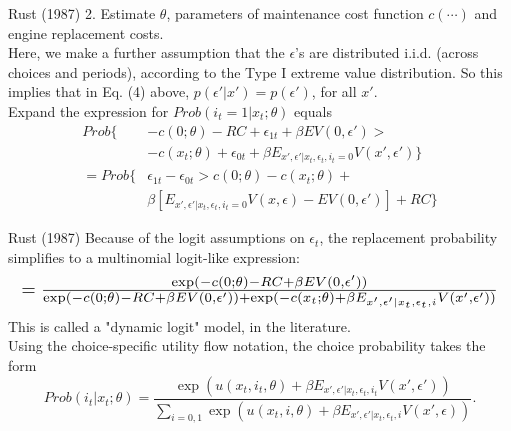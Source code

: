 \documentclass[xcolor=pdftex,dvipsnames,table,mathserif]{beamer}
\begin{document}
\begin{frame}{Rust (1987)}
2. Estimate $\theta$, parameters of maintenance cost function $c (\cdots)$ and engine replacement costs. \\
\vspace{3mm}
Here, we make a further assumption that the $\epsilon$'s are distributed i.i.d. (across choices and periods), according to the Type I extreme value distribution. So this implies that in Eq. (4) above, $p(\epsilon ' | x') = p(\epsilon ')$, for all $x'$. \\
\vspace{3mm}
Expand the expression for $Prob(i_t = 1 |x_t; \theta)$ equals
\begin{equation*}
\begin{split}
 Prob \{& -c(0; \theta) - RC + \epsilon_{1t} + \beta  EV(0, \epsilon ') > \\
  &- c(x_t; \theta) + \epsilon_{0t}  + \beta E_{x', \epsilon ' | x_t, \epsilon_t, i_t =0 } V( x', \epsilon ' ) \} \\
= Prob \{& \epsilon_{1t} - \epsilon_{0t} > c(0;\theta) - c(x_t; \theta) + \\
& \beta [E_{x', \epsilon ' | x_t, \epsilon_t, i_t =0 }  V( x, \epsilon )  - EV(0, \epsilon ')] + RC \}
\end{split}
\end{equation*}
\end{frame}

\begin{frame}{Rust (1987)}
Because of the logit assumptions on $\epsilon_t$, the replacement probability simplifies to a multinomial logit-like expression:
\begin{equation*}
\begin{split}
\resizebox{.99\hsize}{!}{$= \frac {\exp ( - c(0; \theta) - RC+ \beta EV (0, \epsilon ')) } { \exp (-c (0; \theta) - RC + \beta EV (0, \epsilon'))+ \exp (-c(x_t; \theta) + \beta E_{x', \epsilon ' | x_t, \epsilon_t, i} V(x', \epsilon')) }$} \\
\end{split}
\end{equation*}
This is called a "dynamic logit" model, in the literature. \\
\vspace{2mm}
Using the choice-specific utility flow notation, the choice probability takes the form 
\begin{equation}
Prob(i_t | x_t;\theta) = \frac {\exp ( u(x_t, i_t, \theta) + \beta E_{x', \epsilon ' | x_t, \epsilon_t, i_t} V(x', \epsilon ' ))} { \sum_{i=0,1} \exp (u (x_t, i, \theta) + \beta E_{x', \epsilon ' | x_t, \epsilon_t, i} V(x', \epsilon))}.
\end{equation}
\end{frame}
\end{document}

